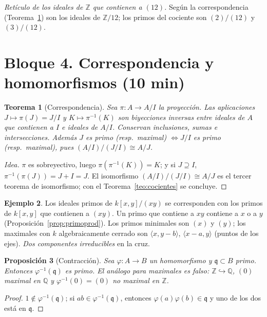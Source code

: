 \documentclass[11pt,a4paper]{article}
\newcommand{\ZZ}{\mathbb{Z}}
\newcommand{\QQ}{\mathbb{Q}}
\newcommand{\qq}{\mathfrak{q}}
\newcommand{\gen}[1]{\langle #1\rangle}
\theoremstyle{plain}
\newtheorem{teorema}{Teorema}[section]
\newtheorem{proposicion}[teorema]{Proposición}
\theoremstyle{definition}
\newtheorem{ejemplo}[teorema]{Ejemplo}
\theoremstyle{remark}
\newcounter{ej}
\begin{document}
\begin{center}
\end{center}
\emph{Retículo de los ideales de $\ZZ$ que contienen a $(12)$.} Según la correspondencia (Teorema~\ref{teo:corresp}) son los ideales de $\ZZ/12$; los primos del cociente son $(2)/(12)$ y $(3)/(12)$.

\section{Bloque 4. Correspondencia y homomorfismos (10 min)}

\begin{teorema}[Correspondencia]\label{teo:corresp}
Sea $\pi:A\to A/I$ la proyección. Las aplicaciones $J\mapsto\pi(J)=J/I$ y $K\mapsto\pi^{-1}(K)$ son biyecciones inversas entre ideales de $A$ que contienen a $I$ e ideales de $A/I$. Conservan inclusiones, sumas e intersecciones. Además $J$ es primo (resp.~maximal) $\iff J/I$ es primo (resp.~maximal), pues $(A/I)/(J/I)\cong A/J$.
\end{teorema}
\begin{proof}[Idea]
$\pi$ es sobreyectivo, luego $\pi(\pi^{-1}(K))=K$; y si $J\supseteq I$, $\pi^{-1}(\pi(J))=J+I=J$. El isomorfismo $(A/I)/(J/I)\cong A/J$ es el tercer teorema de isomorfismo; con el Teorema~\ref{teo:cocientes} se concluye.
\end{proof}

\begin{ejemplo}
Los ideales primos de $k[x,y]/(xy)$ se corresponden con los primos de $k[x,y]$ que contienen a $(xy)$. Un primo que contiene a $xy$ contiene a $x$ o a $y$ (Proposición~\ref{prop:primoprod}). Los primos minimales son $(x)$ y $(y)$; los maximales con $k$ algebraicamente cerrado son $\gen{x,y-b}$, $\gen{x-a,y}$ (puntos de los ejes). \emph{Dos componentes irreducibles} en la cruz.
\end{ejemplo}

\begin{proposicion}[Contracción]\label{prop:contr}
Sea $\varphi:A\to B$ un homomorfismo y $\qq\subset B$ primo. Entonces $\varphi^{-1}(\qq)$ es primo. El análogo para maximales es falso: $\ZZ\hookrightarrow\QQ$, $(0)$ maximal en $\QQ$ y $\varphi^{-1}(0)=(0)$ no maximal en $\ZZ$.
\end{proposicion}
\begin{proof}
$1\notin\varphi^{-1}(\qq)$; si $ab\in\varphi^{-1}(\qq)$, entonces $\varphi(a)\varphi(b)\in\qq$ y uno de los dos está en $\qq$.
\end{proof}
\end{document}
